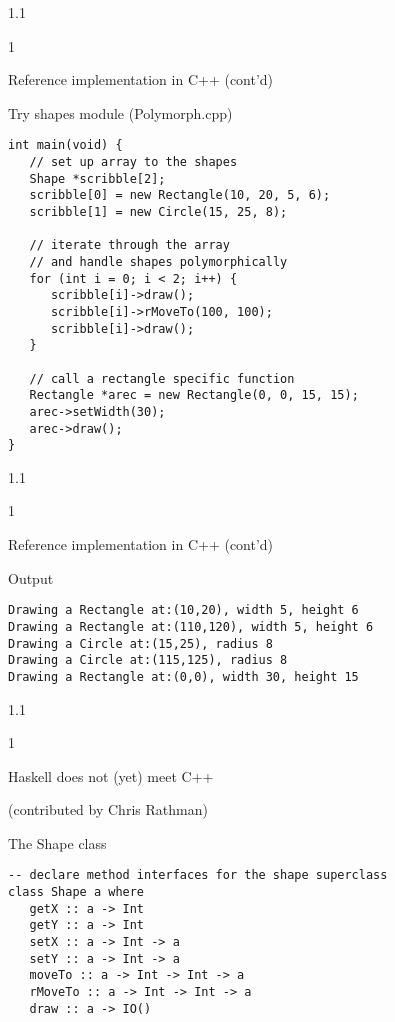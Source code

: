 \documentclass{slides}
\newenvironment{myslide}{\begin{slide}\color{Blue}\begin{boxedminipage}{1.1\hsize}\begin{boxedminipage}{1\hsize}\color{Black}
\vspace{-170\in}
}{%
\smallskip
\end{boxedminipage}
\end{boxedminipage}
\end{slide}}
\newenvironment{myslide}{\begin{slide}
}{%
\end{slide}}
\newenvironment{myslide}{\begin{slide}\color{White}\begin{boxedminipage}{1.1\hsize}\color{Black}
\vspace{-170\in}
}{%
\smallskip
\end{boxedminipage}
\end{slide}}
\newcommand{\header}[1]{{\large \color{Red} #1}}
\begin{document}
\begin{myslide}

\header{Reference implementation in C++ (cont'd)}

Try shapes module (Polymorph.cpp)

{\tiny

\begin{verbatim}
int main(void) {
   // set up array to the shapes
   Shape *scribble[2];
   scribble[0] = new Rectangle(10, 20, 5, 6);
   scribble[1] = new Circle(15, 25, 8);

   // iterate through the array
   // and handle shapes polymorphically
   for (int i = 0; i < 2; i++) {
      scribble[i]->draw();
      scribble[i]->rMoveTo(100, 100);
      scribble[i]->draw();
   }

   // call a rectangle specific function
   Rectangle *arec = new Rectangle(0, 0, 15, 15);
   arec->setWidth(30);
   arec->draw();
}
\end{verbatim}

}

\end{myslide}






\begin{myslide}

\header{Reference implementation in C++ (cont'd)}

Output

{\tiny

\begin{verbatim}
Drawing a Rectangle at:(10,20), width 5, height 6
Drawing a Rectangle at:(110,120), width 5, height 6
Drawing a Circle at:(15,25), radius 8
Drawing a Circle at:(115,125), radius 8
Drawing a Rectangle at:(0,0), width 30, height 15
\end{verbatim}

}

\end{myslide}






\begin{myslide}

\header{Haskell does not (yet) meet C++}

(contributed by Chris Rathman)

The Shape class

{\tiny

\begin{verbatim}
-- declare method interfaces for the shape superclass
class Shape a where
   getX :: a -> Int
   getY :: a -> Int
   setX :: a -> Int -> a
   setY :: a -> Int -> a
   moveTo :: a -> Int -> Int -> a
   rMoveTo :: a -> Int -> Int -> a
   draw :: a -> IO()
\end{verbatim}

}

\end{myslide}
\end{document}
